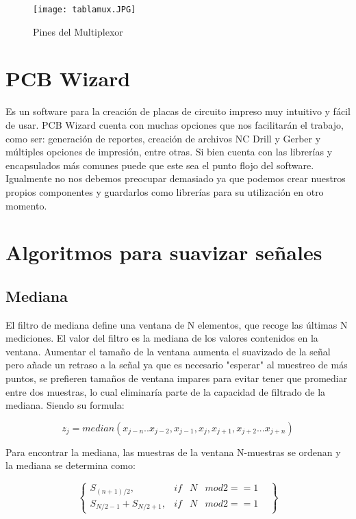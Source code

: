 \documentclass[10pt,a4paper]{article}
\begin{document}
\begin{figure}[H]
\centering
 \texttt{[image: tablamux.JPG]} 
\caption{Pines del Multiplexor} 
\end{figure}


\section{PCB Wizard}

Es un software para la creación de placas de circuito impreso muy intuitivo y fácil de usar. PCB Wizard cuenta con muchas opciones que nos facilitarán el trabajo, como ser: generación de reportes, creación de archivos NC Drill y Gerber y múltiples opciones de impresión, entre otras. Si bien cuenta con las librerías y encapsulados más comunes puede que este sea el punto flojo del software. Igualmente no nos debemos preocupar demasiado ya que podemos crear nuestros propios componentes y guardarlos como librerías para su utilización en otro momento. 

\section{Algoritmos para suavizar señales}
\subsection{Mediana}

El filtro de mediana define una ventana de N elementos, que recoge las últimas N mediciones. El valor del filtro es la mediana de los valores contenidos en la ventana.
Aumentar el tamaño de la ventana aumenta el suavizado de la señal pero añade un retraso a la señal ya que es necesario "esperar" al muestreo de más puntos, se prefieren tamaños de ventana impares para evitar tener que promediar entre dos muestras, lo cual eliminaría parte de la capacidad de filtrado de la mediana. Siendo su formula:

\begin{equation}
z_{j}=median (x_{j-n}..x_{j-2},x_{j-1},x_{j},x_{j+1},x_{j+2}...x_{j+n})
\end{equation}

Para encontrar la mediana, las muestras de la ventana N-muestras se ordenan y la mediana se determina como:

\begin{equation}
\begin{Bmatrix}
S_{(n+1)/2} , & if  & N & mod 2==1 & \\
S_{N/2-1}+S_{N/2+1}, & if  &  N &  mod 2==1 & 
\end{Bmatrix}
\end{equation}
\end{document}
